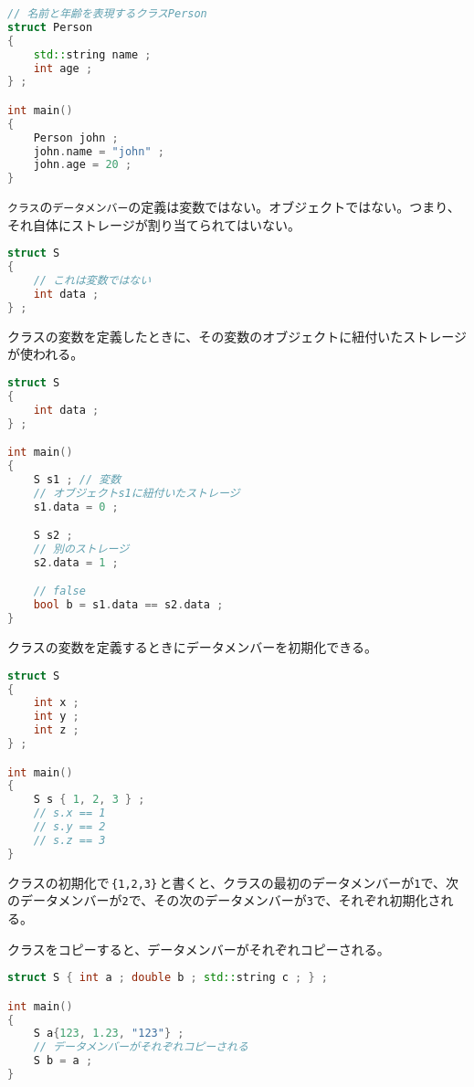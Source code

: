 \begin{lstlisting}[language={C++}]
// 名前と年齢を表現するクラスPerson
struct Person
{
    std::string name ;
    int age ;
} ;

int main()
{
    Person john ;
    john.name = "john" ;
    john.age = 20 ;
}
\end{lstlisting}

\texttt{クラス}の\texttt{データメンバー}の定義は変数ではない。オブジェクトではない。つまり、それ自体にストレージが割り当てられてはいない。

\begin{lstlisting}[language={C++}]
struct S
{
    // これは変数ではない
    int data ;
} ;
\end{lstlisting}

クラスの変数を定義したときに、その変数のオブジェクトに紐付いたストレージが使われる。

\begin{lstlisting}[language={C++}]
struct S
{
    int data ;
} ;

int main()
{
    S s1 ; // 変数
    // オブジェクトs1に紐付いたストレージ
    s1.data = 0 ;

    S s2 ;
    // 別のストレージ
    s2.data = 1 ; 

    // false
    bool b = s1.data == s2.data ;
}
\end{lstlisting}

クラスの変数を定義するときにデータメンバーを初期化できる。

\begin{lstlisting}[language={C++}]
struct S
{
    int x ;
    int y ;
    int z ;
} ;

int main()
{
    S s { 1, 2, 3 } ;
    // s.x == 1
    // s.y == 2
    // s.z == 3
}
\end{lstlisting}

クラスの初期化で\,\texttt{\{1,2,3\}}\,と書くと、クラスの最初のデータメンバーが\texttt{1}で、次のデータメンバーが\texttt{2}で、その次のデータメンバーが\texttt{3}で、それぞれ初期化される。

クラスをコピーすると、データメンバーがそれぞれコピーされる。

\begin{lstlisting}[language={C++}]
struct S { int a ; double b ; std::string c ; } ;

int main()
{
    S a{123, 1.23, "123"} ;
    // データメンバーがそれぞれコピーされる
    S b = a ;
}
\end{lstlisting}

